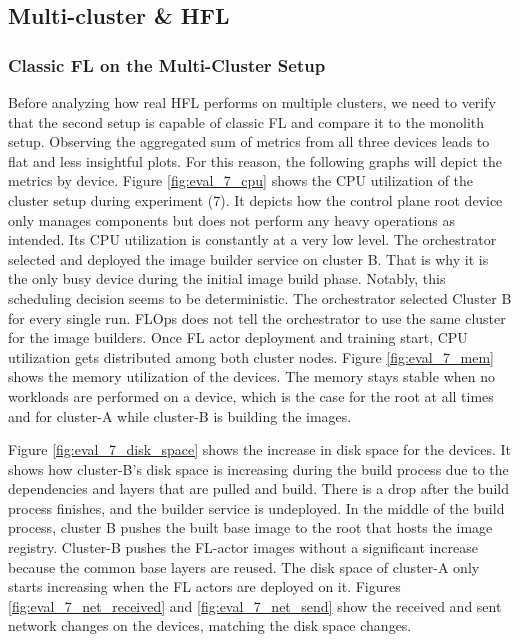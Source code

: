 
\subsection{Multi-cluster \& HFL}

\subsubsection{Classic FL on the Multi-Cluster Setup}

Before analyzing how real HFL performs on multiple clusters, we need to verify that the second setup is capable of classic FL and compare it to the monolith setup.
Observing the aggregated sum of metrics from all three devices leads to flat and less insightful plots.
For this reason, the following graphs will depict the metrics by device.
Figure \ref{fig:eval_7_cpu} shows the CPU utilization of the cluster setup during experiment (7).
It depicts how the control plane root device only manages components but does not perform any heavy operations as intended.
Its CPU utilization is constantly at a very low level.
The orchestrator selected and deployed the image builder service on cluster B.
That is why it is the only busy device during the initial image build phase.
Notably, this scheduling decision seems to be deterministic.
The orchestrator selected Cluster B for every single run.
FLOps does not tell the orchestrator to use the same cluster for the image builders.
Once FL actor deployment and training start, CPU utilization gets distributed among both cluster nodes.
Figure \ref{fig:eval_7_mem} shows the memory utilization of the devices.
The memory stays stable when no workloads are performed on a device, which is the case for the root at all times and for cluster-A while cluster-B is building the images. 

Figure \ref{fig:eval_7_disk_space} shows the increase in disk space for the devices.
It shows how cluster-B's disk space is increasing during the build process due to the dependencies and layers that are pulled and build.
There is a drop after the build process finishes, and the builder service is undeployed.
In the middle of the build process, cluster B pushes the built base image to the root that hosts the image registry.
Cluster-B pushes the FL-actor images without a significant increase because the common base layers are reused.
The disk space of cluster-A only starts increasing when the FL actors are deployed on it.
Figures \ref{fig:eval_7_net_received} and \ref{fig:eval_7_net_send} show the received and sent network changes on the devices, matching the disk space changes.

